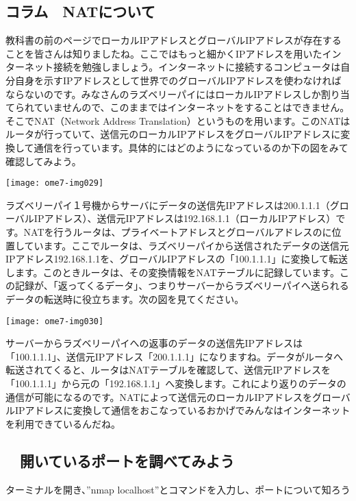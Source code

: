 {\bfseries {}}

\clearpage
\subsection*{\bfseries コラム　NATについて}

教科書の前のページでローカルIPアドレスとグローバルIPアドレスが存在することを皆さんは知りましたね。ここではもっと細かくIPアドレスを用いたインターネット接続を勉強しましょう。インターネットに接続するコンピュータは自分自身を示すIPアドレスとして世界でのグローバルIPアドレスを使わなければならないのです。みなさんのラズベリーパイにはローカルIPアドレスしか割り当てられていませんので、このままではインターネットをすることはできません。そこでNAT（Network
Address
Translation）というものを用います。このNATはルータが行っていて、送信元のローカルIPアドレスをグローバルIPアドレスに変換して通信を行っています。具体的にはどのようになっているのか下の図をみて確認してみよう。

\centering
\texttt{[image: ome7-img029]}
\flushleft

\clearpage
ラズベリーパイ１号機からサーバにデータの送信先IPアドレスは200.1.1.1（グローバルIPアドレス）、送信元IPアドレスは192.168.1.1（ローカルIPアドレス）です。NATを行うルータは、プライベートアドレスとグローバルアドレスのに位置しています。ここでルータは、ラズベリーパイから送信されたデータの送信元IPアドレス192.168.1.1を、グローバルIPアドレスの「100.1.1.1」に変換して転送します。このときルータは、その変換情報をNATテーブルに記録しています。この記録が、「返ってくるデータ」、つまりサーバーからラズベリーパイへ送られるデータの転送時に役立ちます。次の図を見てください。

\centering
\texttt{[image: ome7-img030]}
\flushleft

サーバーからラズベリーパイへの返事のデータの送信先IPアドレスは「100.1.1.1」、送信元IPアドレス「200.1.1.1」になりますね。データがルータへ転送されてくると、ルータはNATテーブルを確認して、送信元IPアドレスを「100.1.1.1」から元の「192.168.1.1」へ変換します。これにより返りのデータの通信が可能になるのです。NATによって送信元のローカルIPアドレスをグローバルIPアドレスに変換して通信をおこなっているおかげでみんなはインターネットを利用できているんだね。

\clearpage
\subsection*{\theExercise　開いているポートを調べてみよう}
\addtocounter{Exercise}{-1}\label{port}
ターミナルを開き、”nmap
localhost”とコマンドを入力し、ポートについて知ろう

